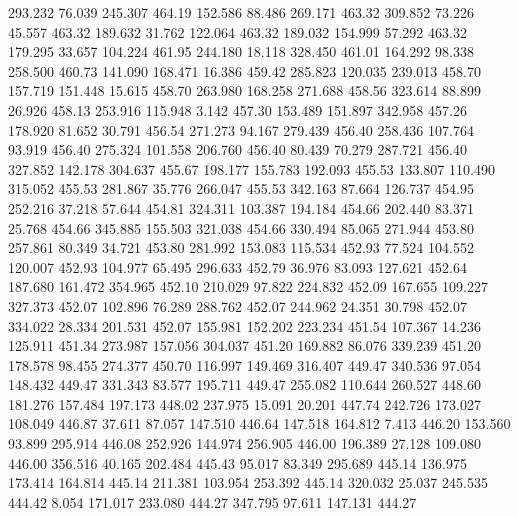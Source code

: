  293.232   76.039  245.307       464.19
 152.586   88.486  269.171       463.32
 309.852   73.226   45.557       463.32
 189.632   31.762  122.064       463.32
 189.032  154.999   57.292       463.32
 179.295   33.657  104.224       461.95
 244.180   18.118  328.450       461.01
 164.292   98.338  258.500       460.73
 141.090  168.471   16.386       459.42
 285.823  120.035  239.013       458.70
 157.719  151.448   15.615       458.70
 263.980  168.258  271.688       458.56
 323.614   88.899   26.926       458.13
 253.916  115.948    3.142       457.30
 153.489  151.897  342.958       457.26
 178.920   81.652   30.791       456.54
 271.273   94.167  279.439       456.40
 258.436  107.764   93.919       456.40
 275.324  101.558  206.760       456.40
  80.439   70.279  287.721       456.40
 327.852  142.178  304.637       455.67
 198.177  155.783  192.093       455.53
 133.807  110.490  315.052       455.53
 281.867   35.776  266.047       455.53
 342.163   87.664  126.737       454.95
 252.216   37.218   57.644       454.81
 324.311  103.387  194.184       454.66
 202.440   83.371   25.768       454.66
 345.885  155.503  321.038       454.66
 330.494   85.065  271.944       453.80
 257.861   80.349   34.721       453.80
 281.992  153.083  115.534       452.93
  77.524  104.552  120.007       452.93
 104.977   65.495  296.633       452.79
  36.976   83.093  127.621       452.64
 187.680  161.472  354.965       452.10
 210.029   97.822  224.832       452.09
 167.655  109.227  327.373       452.07
 102.896   76.289  288.762       452.07
 244.962   24.351   30.798       452.07
 334.022   28.334  201.531       452.07
 155.981  152.202  223.234       451.54
 107.367   14.236  125.911       451.34
 273.987  157.056  304.037       451.20
 169.882   86.076  339.239       451.20
 178.578   98.455  274.377       450.70
 116.997  149.469  316.407       449.47
 340.536   97.054  148.432       449.47
 331.343   83.577  195.711       449.47
 255.082  110.644  260.527       448.60
 181.276  157.484  197.173       448.02
 237.975   15.091   20.201       447.74
 242.726  173.027  108.049       446.87
  37.611   87.057  147.510       446.64
 147.518  164.812    7.413       446.20
 153.560   93.899  295.914       446.08
 252.926  144.974  256.905       446.00
 196.389   27.128  109.080       446.00
 356.516   40.165  202.484       445.43
  95.017   83.349  295.689       445.14
 136.975  173.414  164.814       445.14
 211.381  103.954  253.392       445.14
 320.032   25.037  245.535       444.42
   8.054  171.017  233.080       444.27
 347.795   97.611  147.131       444.27

